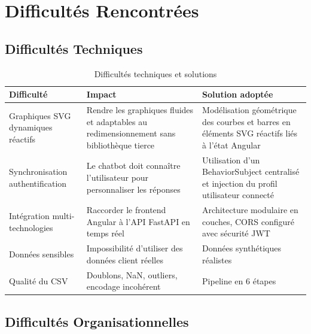 \documentclass[12pt,a4paper]{report}
\begin{document}
\chapter{Difficultés Rencontrées}

\section{Difficultés Techniques}

\begin{table}[H]
\centering
\caption{Difficultés techniques et solutions}
\begin{tabularx}{\textwidth}{|l|X|X|}
\hline
\textbf{Difficulté} & \textbf{Impact} & \textbf{Solution adoptée} \\
\hline
Graphiques SVG dynamiques réactifs & Rendre les graphiques fluides et adaptables au redimensionnement sans bibliothèque tierce & Modélisation géométrique des courbes et barres en éléments SVG réactifs liés à l'état Angular \\
\hline
Synchronisation authentification & Le chatbot doit connaître l'utilisateur pour personnaliser les réponses & Utilisation d'un BehaviorSubject centralisé et injection du profil utilisateur connecté \\
\hline
Intégration multi-technologies & Raccorder le frontend Angular à l'API FastAPI en temps réel & Architecture modulaire en couches, CORS configuré avec sécurité JWT \\
\hline
Données sensibles & Impossibilité d'utiliser des données client réelles & Données synthétiques réalistes \\
\hline
Qualité du CSV & Doublons, NaN, outliers, encodage incohérent & Pipeline en 6 étapes \\
\hline
\end{tabularx}
\end{table}

\section{Difficultés Organisationnelles}
\end{document}
